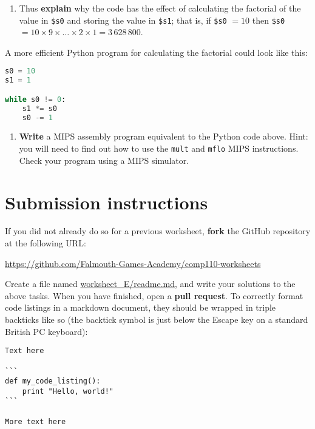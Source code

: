 \documentclass{../../fal_assignment}
\begin{document}
\begin{enumerate}[resume,label=(\alph*)]
	\item Thus \textbf{explain} why the code has the effect of calculating the factorial of the value in \lstinline{$s0}
and storing the value in \lstinline{$s1};
that is, if \lstinline{$s0} $= 10$ then \lstinline{$s0} $= 10 \times 9 \times \dots \times 2 \times 1 = 3\,628\,800$.
\end{enumerate}

A more efficient Python program for calculating the factorial could look like this:

\begin{lstlisting}[language=Python]
s0 = 10
s1 = 1

while s0 != 0:
    s1 *= s0
    s0 -= 1
\end{lstlisting}

\begin{enumerate}[resume,label=(\alph*)]
	\item \textbf{Write} a MIPS assembly program equivalent to the Python code above.
	Hint: you will need to find out how to use the \lstinline{mult} and \lstinline{mflo} MIPS instructions.
	Check your program using a MIPS simulator.
\end{enumerate}

\iffalse
$ %
\fi

\section*{Submission instructions}

If you did not already do so for a previous worksheet, \textbf{fork} the GitHub repository at the following URL:

\url{https://github.com/Falmouth-Games-Academy/comp110-worksheets}

Create a file named \url{worksheet_E/readme.md}, and write your solutions to the above tasks.
When you have finished, open a \textbf{pull request}.
To correctly format code listings in a markdown document, they should be wrapped in triple backticks like so
(the backtick symbol is just below the Escape key on a standard British PC keyboard):

\begin{lstlisting}[language={},upquote=true]
Text here

```
def my_code_listing():
    print "Hello, world!"
```

More text here
\end{lstlisting}
\end{document}
